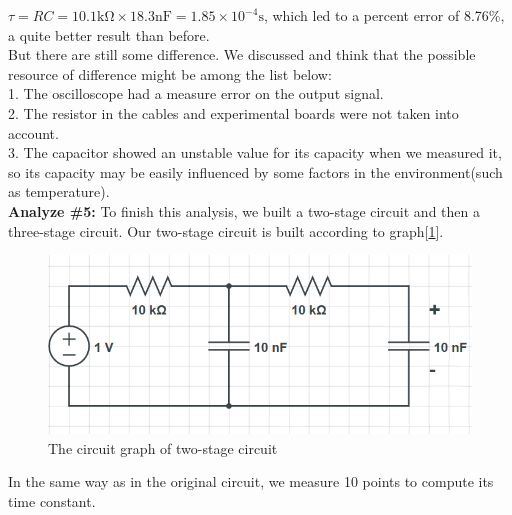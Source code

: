 $\tau = RC = 10.1\mathrm{k\Omega} \times 18.3 \mathrm{nF} = 1.85\times10^{-4}\mathrm{s}$, which led to a percent error of 8.76\%, a quite better result than before.\\
\phantom{ } But there are still some difference. We discussed and think that the possible resource of difference might be among the list below:\\
1. The oscilloscope had a measure error on the output signal.\\
2. The resistor in the cables and experimental boards were not taken into account.\\
3. The capacitor showed an unstable value for its capacity when we measured it, so its capacity may be easily influenced by some factors in the environment(such as temperature).\\
\newline
\textbf{Analyze \#5:} \newline
\phantom{ } To finish this analysis, we built a two-stage circuit and then a three-stage circuit. Our two-stage circuit is built according to graph[\ref{fig:2.3}].\\
\begin{figure}[!htbp]
	\centering %
	\begin{framed}
	\includegraphics[width=\linewidth]{images/2_3.PNG} %
	\caption{The circuit graph of two-stage circuit} %
	\end{framed}
	\label{fig:2.3} %
\end{figure}
\phantom{ } In the same way as in the original circuit, we measure 10 points to compute its time constant.
